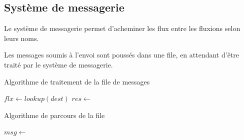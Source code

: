 


\subsection{Système de messagerie}

Le système de messagerie permet d'acheminer les flux entre les fluxions selon leurs noms.



Les messages soumis à l'envoi sont poussés dans une file, en attendant d'être traité par le système de messagerie.

\begin{algorithm}
\caption{Algorithme de traitement de la file de messages}
\begin{algorithmic}
\State $flx \gets lookup(dest)$
\State $res \gets$ 
\State {}
\EndFor
\EndFunction
\end{algorithmic}
\end{algorithm}

\begin{algorithm}
\caption{Algorithme de parcours de la file}
\begin{algorithmic}
\State $msg \gets$ 
\State {}
\EndWhile
\EndFunction
\end{algorithmic}
\end{algorithm}

